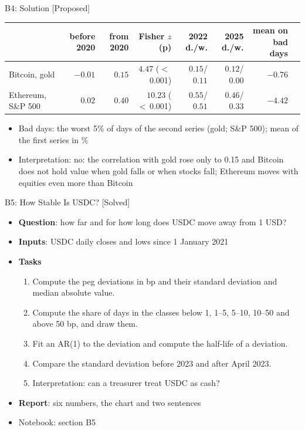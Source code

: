 \ifsolutions
\begin{frame}{B4: Solution [Proposed]}
\itemsize{\footnotesize}
\begin{center}
\scriptsize
\begin{tabular}{lrrrrrrr}
\toprule
& before 2020 & from 2020 & Fisher $z$ (p) & 2022 d./w. & 2025 d./w. & mean on bad days \\
\midrule
Bitcoin, gold & $-0.01$ & $0.15$ & $4.47$ ($<$\,0.001) & $0.15$/$0.11$ & $0.12$/$0.00$ & $-0.76$ \\
Ethereum, S\&P 500 & $0.02$ & $0.40$ & $10.23$ ($<$\,0.001) & $0.55$/$0.51$ & $0.46$/$0.33$ & $-4.42$ \\
\bottomrule
\end{tabular}
\end{center}
\begin{itemize}
    \item Bad days: the worst 5\% of days of the second series (gold; S\&P 500); mean of the first series in \%
    \item Interpretation: no: the correlation with gold rose only to 0.15 and Bitcoin does not hold value when gold falls or when stocks fall; Ethereum moves with equities even more than Bitcoin
\end{itemize}
\end{frame}
\fi

\begin{frame}{B5: How Stable Is USDC? [Solved]}
\itemsize{\footnotesize}
\begin{itemize}
\item \textbf{Question}: how far and for how long does USDC move away from 1 USD?
\item \textbf{Inputs}: USDC daily closes and lows since 1 January 2021
\item \textbf{Tasks}
\begin{enumerate}
    \item Compute the peg deviations in bp and their standard deviation and median absolute value.
    \item Compute the share of days in the classes below 1, 1--5, 5--10, 10--50 and above 50 bp, and draw them.
    \item Fit an AR(1) to the deviation and compute the half-life of a deviation.
    \item Compare the standard deviation before 2023 and after April 2023.
    \item Interpretation: can a treasurer treat USDC as cash?
\end{enumerate}
\item \textbf{Report}: six numbers, the chart and two sentences
\item Notebook: section B5
\end{itemize}
\end{frame}

